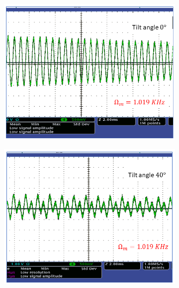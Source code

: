  \begin{figure}
    \centering
    \begin{subfigure}[b]{0.45\textwidth}
        \centering
        \includegraphics[width=\textwidth,trim={0cm 0.5cm 0cm 0cm},clip]{figures/tilt1.png}
        \caption{}
        \label{fig:tilt_0_degree}
    \end{subfigure}
    \hfill
    \begin{subfigure}[b]{0.45\textwidth}
        \centering
        \includegraphics[width=\textwidth,trim={0.7cm 0.5cm 0cm 0cm},clip]{figures/tilt2.png}
        \caption{}
        \label{fig:tilt_40_degree}
    \end{subfigure}

\end{figure}
